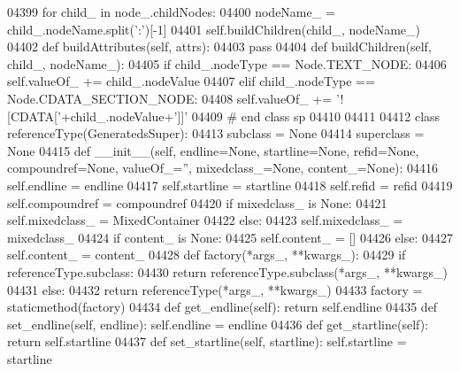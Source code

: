\begin{DoxyCode}
{{{{{{{{{{{{{{{{{{{{{{{{{{{{{{{{{{{{{{{{{{{{{{{{{{{{{{{{{{{{{{{{{{{{{{{{{{{{{{{{{{{{{{{{{{{{{{{{{{{{{{{{{{{{{{{{{{{{{{{{{{{{{{{{{{{{{{{{{{{{{{{{{{{{{{{{{{{{{{{{{{{{{{{{{{{{{{{{{{{{{{{{{{{{{{{{{{{{{{{{{{{{{{{{{{{{{{{{{{{{{{{{{{{{{{{{{{{{{{{{{{{{{{{{{{{{{{{{{{{{{{{{{{{{{{{{{{{{{{{{{{{{{{{04399         \textcolor{keywordflow}{for} child\_ \textcolor{keywordflow}{in} node\_.childNodes:
04400             nodeName\_ = child\_.nodeName.split(\textcolor{stringliteral}{':'})[-1]
04401             self.buildChildren(child\_, nodeName\_)
04402     \textcolor{keyword}{def }buildAttributes(self, attrs):
04403         \textcolor{keywordflow}{pass}
04404     \textcolor{keyword}{def }buildChildren(self, child\_, nodeName\_):
04405         \textcolor{keywordflow}{if} child\_.nodeType == Node.TEXT\_NODE:
04406             self.valueOf\_ += child\_.nodeValue
04407         \textcolor{keywordflow}{elif} child\_.nodeType == Node.CDATA\_SECTION\_NODE:
04408             self.valueOf\_ += \textcolor{stringliteral}{'![CDATA['}+child\_.nodeValue+\textcolor{stringliteral}{']]'}
04409 \textcolor{comment}{# end class sp}
04410 
04411 
04412 \textcolor{keyword}{class }referenceType(GeneratedsSuper):
04413     subclass = \textcolor{keywordtype}{None}
04414     superclass = \textcolor{keywordtype}{None}
04415     \textcolor{keyword}{def }__init__(self, endline=None, startline=None, refid=None, compoundref=None, valueOf\_='', 
      mixedclass\_=None, content\_=None):
04416         self.endline = endline
04417         self.startline = startline
04418         self.refid = refid
04419         self.compoundref = compoundref
04420         \textcolor{keywordflow}{if} mixedclass\_ \textcolor{keywordflow}{is} \textcolor{keywordtype}{None}:
04421             self.mixedclass_ = MixedContainer
04422         \textcolor{keywordflow}{else}:
04423             self.mixedclass_ = mixedclass\_
04424         \textcolor{keywordflow}{if} content\_ \textcolor{keywordflow}{is} \textcolor{keywordtype}{None}:
04425             self.content_ = []
04426         \textcolor{keywordflow}{else}:
04427             self.content_ = content\_
04428     \textcolor{keyword}{def }factory(*args\_, **kwargs\_):
04429         \textcolor{keywordflow}{if} referenceType.subclass:
04430             \textcolor{keywordflow}{return} referenceType.subclass(*args\_, **kwargs\_)
04431         \textcolor{keywordflow}{else}:
04432             \textcolor{keywordflow}{return} referenceType(*args\_, **kwargs\_)
04433     factory = staticmethod(factory)
04434     \textcolor{keyword}{def }get_endline(self): \textcolor{keywordflow}{return} self.endline
04435     \textcolor{keyword}{def }set_endline(self, endline): self.endline = endline
04436     \textcolor{keyword}{def }get_startline(self): \textcolor{keywordflow}{return} self.startline
04437     \textcolor{keyword}{def }set_startline(self, startline): self.startline = startline
}}}}}}}}}}}}}}}}}}}}}}}}}}}}}}}}}}}}}}}}}}}}}}}}}}}}}}}}}}}}}}}}}}}}}}}}}}}}}}}}}}}}}}}}}}}}}}}}}}}}}}}}}}}}}}}}}}}}}}}}}}}}}}}}}}}}}}}}}}}}}}}}}}}}}}}}}}}}}}}}}}}}}}}}}}}}}}}}}}}}}}}}}}}}}}}}}}}}}}}}}}}}}}}}}}}}}}}}}}}}}}}}}}}}}}}}}}}}}}}}}}}}}}}}}}}}}}}}}}}}}}}}}}}}}}}}}}}}}}}}}}}}}}}
\end{DoxyCode}
